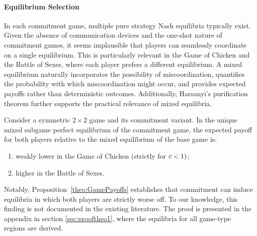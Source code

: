 \documentclass[../paper.tex]{subfiles}
\begin{document}
\paragraph{Equilibrium Selection} In each commitment game, multiple pure strategy Nash equilibria typically exist. Given the absence of communication devices and the one-shot nature of commitment games, it seems implausible that players can seamlessly coordinate on a single equilibrium. This is particularly relevant in the Game of Chicken and the Battle of Sexes, where each player prefers a different equilibrium. A mixed equilibrium naturally incorporates the possibility of miscoordination, quantifies the probability with which miscoordination might occur, and provides expected payoffs rather than deterministic outcomes. Additionally, Harsanyi’s purification theorem \parencite[]{harsanyi_games_1973} further supports the practical relevance of mixed equilibria. 
\begin{proposition}\label{theo:GamePayoffs}
Consider a symmetric $2\times2$ game and its commitment variant. In the unique mixed subgame perfect equilibrium of the commitment game, the expected payoff for both players relative to the mixed equilibrium of the base game is:
\begin{enumerate}
    \item weakly lower in the Game of Chicken (strictly for $c<1)$;
    \item higher in the Battle of Sexes.
\end{enumerate}
\end{proposition}
\noindent Notably, Proposition~\ref{theo:GamePayoffs} establishes that commitment can induce equilibria in which both players are strictly worse off. To our knowledge, this finding is not documented in the existing literature. The proof is presented in the appendix in section \ref{sec:prooftheo1}, where the equilibria for all game-type regions are derived. 
 
\end{document}
